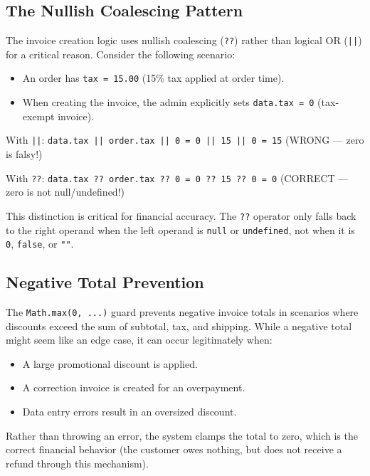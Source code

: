 \documentclass[12pt,a4paper]{report}
\begin{document}
\subsection{The Nullish Coalescing Pattern}

The invoice creation logic uses nullish coalescing (\texttt{??}) rather than logical OR (\texttt{||}) for a critical reason. Consider the following scenario:

\begin{itemize}[leftmargin=1.5em]
  \item An order has \texttt{tax = 15.00} (15\% tax applied at order time).
  \item When creating the invoice, the admin explicitly sets \texttt{data.tax = 0} (tax-exempt invoice).
\end{itemize}

With \texttt{||}: \texttt{data.tax || order.tax || 0 = 0 || 15 || 0 = 15} (WRONG --- zero is falsy!)

With \texttt{??}: \texttt{data.tax ?? order.tax ?? 0 = 0 ?? 15 ?? 0 = 0} (CORRECT --- zero is not null/undefined!)

This distinction is critical for financial accuracy. The \texttt{??} operator only falls back to the right operand when the left operand is \texttt{null} or \texttt{undefined}, not when it is \texttt{0}, \texttt{false}, or \texttt{""}.

\subsection{Negative Total Prevention}

The \texttt{Math.max(0, ...)} guard prevents negative invoice totals in scenarios where discounts exceed the sum of subtotal, tax, and shipping. While a negative total might seem like an edge case, it can occur legitimately when:
\begin{itemize}[leftmargin=1.5em]
  \item A large promotional discount is applied.
  \item A correction invoice is created for an overpayment.
  \item Data entry errors result in an oversized discount.
\end{itemize}

Rather than throwing an error, the system clamps the total to zero, which is the correct financial behavior (the customer owes nothing, but does not receive a refund through this mechanism).
\end{document}
